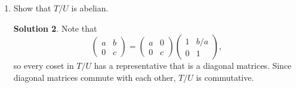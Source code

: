 \documentclass{article}
\theoremstyle{definition}
\newtheorem*{solution}{Solution}
\begin{document}
\begin{enumerate}
\begin{enumerate}
\begin{solution}
\begin{align*}
\begin{pmatrix} a & b \\ 0 & c \end{pmatrix} \begin{pmatrix} 1 & x \\ 0 & 1 \end{pmatrix} \begin{pmatrix} a & b \\ 0 & c \end{pmatrix}^{-1} &= \begin{pmatrix} a & ax+b \\ 0 & c \end{pmatrix} \begin{pmatrix} 1/a & -b/(ac) \\ 0 & 1/c \end{pmatrix} \\
&= \begin{pmatrix} 1 & ax/c \\ 0 & 1 \end{pmatrix}
\end{align*}
\end{solution}
\item Show that $T/U$ is abelian.
\begin{solution}
Note that
\[
\begin{pmatrix} a & b \\ 0 & c \end{pmatrix} = \begin{pmatrix} a & 0 \\ 0 & c \end{pmatrix} \begin{pmatrix} 1 & b/a \\ 0 & 1 \end{pmatrix},
\]
so every coset in $T/U$ has a representative that is a diagonal matrices.  Since diagonal matrices commute with each other, $T/U$ is commutative.


\end{solution}
\end{enumerate}
\end{enumerate}
\end{document}
